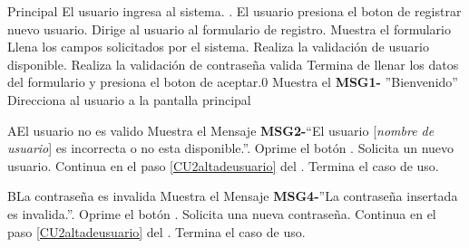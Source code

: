 	\begin{UCtrayectoria}{Principal}
		\UCpaso[\UCactor] El usuario ingresa al sistema.  \label{CU17Login}.
		\UCpaso[\UCactor] El usuario presiona el boton de registrar nuevo usuario.%
		\UCpaso Dirige al usuario al formulario de registro.%
		\UCpaso Muestra el formulario%
		\UCpaso[\UCactor] Llena los campos solicitados por el sistema.
		\UCpaso Realiza la validación de usuario disponible. \label{CU2altadeusuario}
		\UCpaso Realiza la validación de contraseña valida	\label{CU2altadeusuario}
		\UCpaso[\UCactor] Termina de llenar los datos del formulario y presiona el boton de aceptar.0 
		\UCpaso Muestra el {\bf MSG1-} ''Bienvenido''%
		\UCpaso Direcciona al usuario a la pantalla principal 
			
	\end{UCtrayectoria}
		
		\begin{UCtrayectoriaA}{A}{El usuario no es valido}
			\UCpaso Muestra el Mensaje {\bf MSG2-}``El usuario [{\em nombre de usuario}] es incorrecta o no esta disponible.''.
			\UCpaso[\UCactor] Oprime el botón .
			\UCpaso Solicita un nuevo usuario. 
			\UCpaso Continua en el paso \ref{CU2altadeusuario} del .
			\UCpaso[] Termina el caso de uso.
		\end{UCtrayectoriaA}
		
		\begin{UCtrayectoriaA}{B}{La contrase\~na es invalida}
			\UCpaso  Muestra el Mensaje {\bf MSG4-}''La contrase\~na insertada es invalida.''.
			\UCpaso[\UCactor] Oprime el botón .
			\UCpaso Solicita una nueva contrase\~na. 
			\UCpaso Continua en el paso \ref{CU2altadeusuario} del .
			\UCpaso[] Termina el caso de uso.
		\end{UCtrayectoriaA}

		
